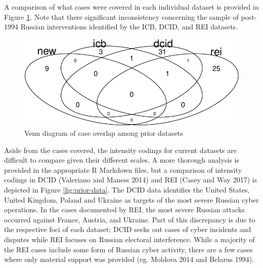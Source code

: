 \documentclass[
]{article}
\begin{document}
A comparison of what cases were covered in each individual dataset is provided in Figure \ref{fig:venn-diagram}. Note that there significant inconsistency concerning the sample of post-1994 Russian interventions identified by the ICB, DCID, and REI datasets.

\begin{figure}[h!]

{\centering \includegraphics{07_Appendix_files/figure-latex/venn-diagram-1} 

}

\caption{Venn diagram of case overlap among prior datasets}\label{fig:venn-diagram}
\end{figure}

Aside from the cases covered, the intensity codings for current datasets are difficult to compare given their different scales. A more thorough analysis is provided in the appropriate R Markdown files, but a comparison of intensity codings in DCID (Valeriano and Maness 2014) and REI (Casey and Way 2017) is depicted in Figure \ref{fig:prior-data}. The DCID data identifies the United States, United Kingdom, Poland and Ukraine as targets of the most severe Russian cyber operations. In the cases documented by REI, the most severe Russian attacks occurred against France, Austria, and Ukraine. Part of this discrepancy is due to the respective foci of each dataset; DCID seeks out cases of cyber incidents and disputes while REI focuses on Russian electoral interference. While a majority of the REI cases include some form of Russian cyber activity, there are a few cases where only material support was provided (eg. Moldova 2014 and Belarus 1994).
\end{document}
